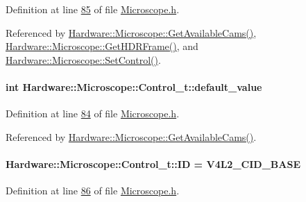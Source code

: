 Definition at line \hyperlink{_microscope_8h_source_l00085}{85} of file \hyperlink{_microscope_8h_source}{Microscope.\+h}.



Referenced by \hyperlink{_microscope_8cpp_source_l00047}{Hardware\+::\+Microscope\+::\+Get\+Available\+Cams()}, \hyperlink{_microscope_8cpp_source_l00333}{Hardware\+::\+Microscope\+::\+Get\+H\+D\+R\+Frame()}, and \hyperlink{_microscope_8cpp_source_l00374}{Hardware\+::\+Microscope\+::\+Set\+Control()}.

\hypertarget{struct_hardware_1_1_microscope_1_1_control__t_a6d10bf874987471188802081f0eb10f3}{}
\paragraph[{default\+\_\+value}]{\setlength{\rightskip}{0pt plus 5cm}int Hardware\+::\+Microscope\+::\+Control\+\_\+t\+::default\+\_\+value}\label{struct_hardware_1_1_microscope_1_1_control__t_a6d10bf874987471188802081f0eb10f3}


Definition at line \hyperlink{_microscope_8h_source_l00084}{84} of file \hyperlink{_microscope_8h_source}{Microscope.\+h}.



Referenced by \hyperlink{_microscope_8cpp_source_l00047}{Hardware\+::\+Microscope\+::\+Get\+Available\+Cams()}.

\hypertarget{struct_hardware_1_1_microscope_1_1_control__t_a7eb33f4df690ac0f388be1305722576d}{}
\paragraph[{I\+D}]{ Hardware\+::\+Microscope\+::\+Control\+\_\+t\+::\+I\+D = V4\+L2\+\_\+\+C\+I\+D\+\_\+\+B\+A\+S\+E}\label{struct_hardware_1_1_microscope_1_1_control__t_a7eb33f4df690ac0f388be1305722576d}


Definition at line \hyperlink{_microscope_8h_source_l00086}{86} of file \hyperlink{_microscope_8h_source}{Microscope.\+h}.



